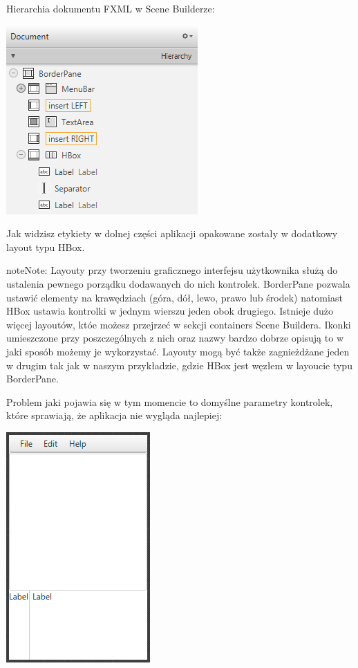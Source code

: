\documentclass[letterpaper,10pt,english]{sphinxmanual}
\begin{document}
Hierarchia dokumentu FXML w Scene Builderze:

{\hfill\includegraphics{hierarchy1.png}\hfill}

Jak widzisz etykiety w dolnej części aplikacji opakowane zostały w dodatkowy layout typu HBox.

\begin{notice}{note}{Note:}
Layouty przy tworzeniu graficznego interfejsu użytkownika służą do ustalenia pewnego porządku dodawanych do nich kontrolek. BorderPane pozwala ustawić elementy na krawędziach (góra, dół, lewo, prawo lub środek) natomiast HBox ustawia kontrolki w jednym wierszu jeden obok drugiego. Istnieje dużo więcej layoutów, któe możesz przejrzeć w sekcji containers Scene Buildera. Ikonki umieszczone przy poszczególnych z nich oraz nazwy bardzo dobrze opisują to w jaki sposób możemy je wykorzystać. Layouty mogą być także zagnieżdżane jeden w drugim tak jak w naszym przykładzie, gdzie HBox jest węzłem w layoucie typu BorderPane.
\end{notice}

Problem jaki pojawia się w tym momencie to domyślne parametry kontrolek, które sprawiają, że aplikacja nie wygląda najlepiej:

{\hfill\includegraphics{view1.png}\hfill}
\end{document}
